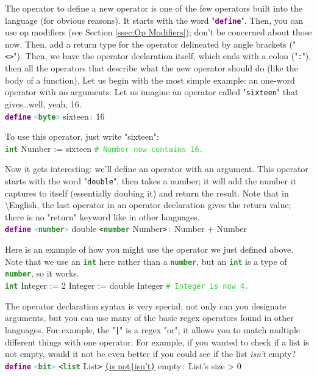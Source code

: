 \documentclass{article}
\newcommand{\English}{\textbackslash{}English}				%
\newcommand{\codecomment}[1]{\texttt{\textcolor{LimeGreen}{#1}}}
\newcommand{\commentline}[1]{\codecomment{\# #1}}
\newcommand{\type}[1]{\texttt{\textcolor{ForestGreen}{\textbf{#1}}}}
\newcommand{\keyop}[1]{\texttt{\textcolor{Purple}{\textbf{#1}}}}
\newcommand{\defpunct}[1]{\texttt{\textcolor{SkyBlue}{\textbf{#1}}}}
\newcommand{\codespecial}[1]{\texttt{\textcolor{CarnationPink}{#1}}}
\newenvironment{code}[0]
{\ttfamily{}				%
\setlength\parindent{0cm}	%
~\\}
{\setlength\parindent{1cm}
~\\}
\begin{document}
\indent The operator to define a new operator is one of the few operators built into the language (for obvious reasons). It starts with the word "\keyop{define}". Then, you can use op modifiers (see Section \ref{ssec:Op Modifiers}); don't be concerned about those now. Then, add a return type for the operator delineated by angle brackets ("\texttt{<>}"). Then, we have the operator declaration itself, which ends with a colon ("\texttt{:}"), then all the operators that describe what the new operator should do (like the body of a function).
\indent Let us begin with the most simple example: an one-word operator with no arguments. Let us imagine an operator called "\texttt{sixteen}" that gives\ldots well, yeah, 16.
\begin{code}
\keyop{define} \defpunct{<}\type{byte}\defpunct{>} sixteen\defpunct{:}
\qquad{}16
\end{code}

\indent To use this operator, just write "sixteen":
\begin{code}
\type{int} Number := sixteen \commentline{Number now contains 16.}
\end{code}

\indent Now it gets interesting: we'll define an operator with an argument. This operator starts with the word "\texttt{double}", then takes a number; it will add the number it captures to itself (essentially doubing it) and return the result. Note that in \English{}, the last operator in an operator declaration gives the return value; there is no "return" keyword like in other languages.
\begin{code}
\keyop{define} \defpunct{<}\type{number}\defpunct{>} double \codespecial{<}\type{number} Number\codespecial{>}\defpunct{:}
\qquad{}Number + Number
\end{code}

\indent Here is an example of how you might use the operator we just defined above. Note that we use an \type{int} here rather than a \type{number}, but an \type{int} is a type of \type{number}, so it works.
\begin{code}
\type{int} Integer := 2
Integer := double Integer \commentline{Integer is now 4.}
\end{code}

\indent The operator declaration syntax is very special; not only can you designate arguments, but you can use many of the basic regex operators found in other languages. For example, the "\codespecial{|}" is a regex "or"; it allows you to match multiple different things with one operator. For example, if you wanted to check if a list is not empty, would it not be even better if you could see if the list \emph{isn't} empty?
\begin{code}
\keyop{define} \defpunct{<}\type{bit}\defpunct{>} \codespecial{<}\type{list} List\codespecial{>} \underline{\codespecial{(}is not\codespecial{|}isn't\codespecial{)}} empty\defpunct{:}
\qquad{}List's size > 0
\end{code}
\end{document}
